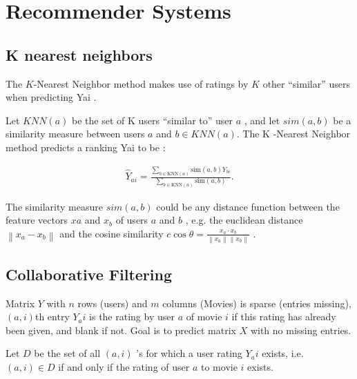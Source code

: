 \section{Recommender Systems}

\subsection{K nearest neighbors}

The  $K$-Nearest Neighbor method makes use of ratings by  $K$  other ``similar'' users when predicting  Yai .

Let  $KNN(a)$  be the set of  K  users ``similar to'' user  $a$ , and let $sim(a,b)$ be a similarity measure between users  $a$  and  $b \in KNN(a)$. The  K -Nearest Neighbor method predicts a ranking  Yai  to be :

\begin{align*}
\widehat{Y}_{ai} = \displaystyle \frac{\displaystyle \sum _{b \in \text {KNN}(a)} \text {sim}(a,b) Y_{bi}}{\displaystyle \sum _{b \in \text {KNN}(a)} \text {sim}(a,b)}.
\end{align*}

 
The similarity measure  $sim(a,b)$  could be any distance function between the feature vectors  $xa$ and  $x_b$  of users  $a$  and  $b$ , e.g. the euclidean distance  $\left\|  x_ a-x_ b \right\|$  and the cosine similarity  $c\displaystyle \cos \theta = \frac{x_ a\cdot x_ b}{\left\|  x_ a \right\| \left\|  x_ b \right\| }$ . 


\subsection{Collaborative Filtering}

Matrix $Y$ with $n$ rows (users) and $m$ columns (Movies) is sparse (entries missing), $(a,i)$th  entry  $Y_ai$  is the rating by user  $a$  of movie  $i$ if this rating has already been given, and blank if not. Goal is to predict matrix $X$ with no missing entries.

Let $D$  be the set of all $(a,i)$ 's for which a user rating  $Y_ai$  exists, i.e. $(a,i) \in D$ if and only if the rating of user  $a$  to movie  $i$  exists.


